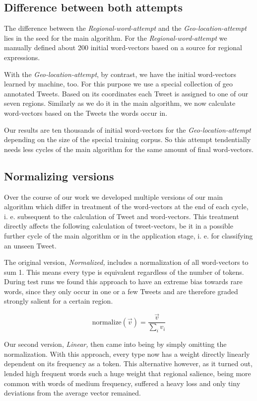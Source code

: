 \documentclass[./Main.tex]{subfiles}
\begin{document}
\subsection{Difference between both attempts}
The difference between the \emph{Regional-word-attempt} and the \emph{Geo-location-attempt} lies in the seed for the main algorithm. For the \emph{Regional-word-attempt} we manually defined about 200 initial word-vectors based on a source for regional expressions.

With the \emph{Geo-location-attempt}, by contrast, we have the initial word-vectors learned by machine, too. For this purpose we use a special collection of geo annotated Tweets. Based on its coordinates each Tweet is assigned to one of our seven regions. Similarly as we do it in the main algorithm, we now calculate word-vectors based on the Tweets the words occur in.

Our results are ten thousands of initial word-vectors for the \emph{Geo-location-attempt} depending on the size of the special training corpus. So this attempt tendentially needs less cycles of the main algorithm for the same amount of final word-vectors.

\subsection{Normalizing versions}
Over the course of our work we developed multiple versions of our main algorithm which differ in treatment of the word-vectors at the end of each cycle, i. e. subsequent to the calculation of Tweet and word-vectors. This treatment directly affects the following calculation of tweet-vectors, be it in a possible further cycle of the main algorithm or in the application stage, i. e. for classifying an unseen Tweet.

The original version, \textit{Normalized,} includes a normalization of all word-vectors to sum 1. This means every type is equivalent regardless of the number of tokens. During test runs we found this approach to have an extreme bias towards rare words, since they only occur in one or a few Tweets and are therefore graded strongly salient for a certain region.

$$\text{normalize}(\vec v) = \frac{\vec v}{\sum_i v_i}$$

Our second version, \textit{Linear,} then came into being by simply omitting the normalization. With this approach, every type now has a weight directly linearly dependent on its frequency as a token. This alternative however, as it turned out, lended high frequent words such a huge weight that regional salience, being more common with words of medium frequency, suffered a heavy loss and only tiny deviations from the average vector remained.
\end{document}
